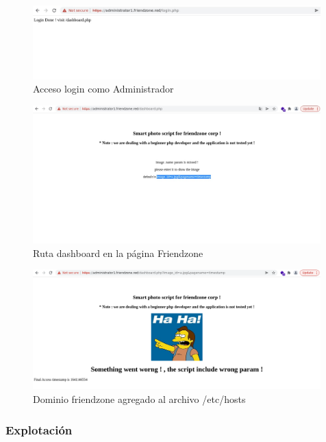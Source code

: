         \begin{figure}[H]
            \centering
            \includegraphics[width=0.99\textwidth]{informe4/imagenes/friendzone/14_login.png}
            \caption{Acceso login como Administrador} 
        \end{figure}

        \begin{figure}[H]
            \centering
            \includegraphics[width=0.99\textwidth]{informe4/imagenes/friendzone/15_dashboard.png}
            \caption{Ruta dashboard en la página Friendzone} 
        \end{figure}

        \begin{figure}[H]
            \centering
            \includegraphics[width=0.99\textwidth]{informe4/imagenes/friendzone/16_dashboardimage.png}
            \caption{Dominio friendzone agregado al archivo /etc/hosts} 
        \end{figure}

    \subsubsection{Explotación}

